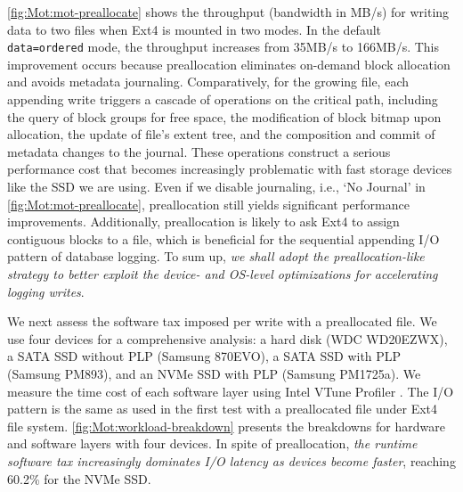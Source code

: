 \autoref{fig:Mot:mot-preallocate} shows the throughput (bandwidth in MB/s) 
for writing data to two files when Ext4 is mounted in two modes. 
In the default \texttt{data=ordered} mode,  
the   throughput increases from 35MB/s to 166MB/s.
This improvement occurs because preallocation eliminates on-demand block allocation 
and avoids metadata journaling.
Comparatively, for the growing file,
each appending write   triggers a cascade of  operations on the critical path, including the query of block groups for free space,
the modification of block bitmap upon allocation,  the update of file's extent tree, 
and the composition and commit of metadata changes to the journal.
These operations   construct a serious performance cost that becomes increasingly problematic with fast storage devices like the  SSD we are using.
Even if we disable   journaling, i.e., `No Journal' in \autoref{fig:Mot:mot-preallocate},
preallocation still yields   significant performance improvements. Additionally, 
preallocation is likely to ask Ext4 to assign contiguous blocks to a file,
which is
 beneficial for the sequential appending I/O pattern of database logging. 
To sum up,
 {\em we shall adopt the preallocation-like strategy 	to better exploit the	device- and OS-level optimizations
for accelerating   logging writes}.

\iftrue
\vspace{1ex}
\noindent{}
\vspace{0.5ex}
\else
\ul{$\vmathbb{O2}$. \em
The runtime software tax is dominated by file system operations  and badly
impairs the performance of  logging.
}
\fi

We next assess the  software tax imposed per   write with a preallocated file.
We use four   devices for a comprehensive analysis:
a   hard disk (WDC WD20EZWX), a SATA SSD without PLP (Samsung 870EVO), a SATA SSD with PLP (Samsung PM893), and an  NVMe SSD with PLP (Samsung PM1725a). 
We measure  the time cost of each software layer   using Intel VTune Profiler \cite{GetStart56:online}. 
The I/O pattern is the same   as used in the first test with a preallocated file under Ext4 file system.
\autoref{fig:Mot:workload-breakdown} presents the breakdowns for hardware and software layers with four devices.
In spite of  preallocation, {\em the runtime
	software tax increasingly dominates   I/O latency
	as   devices become faster}, reaching  60.2\% for the   NVMe SSD. 

